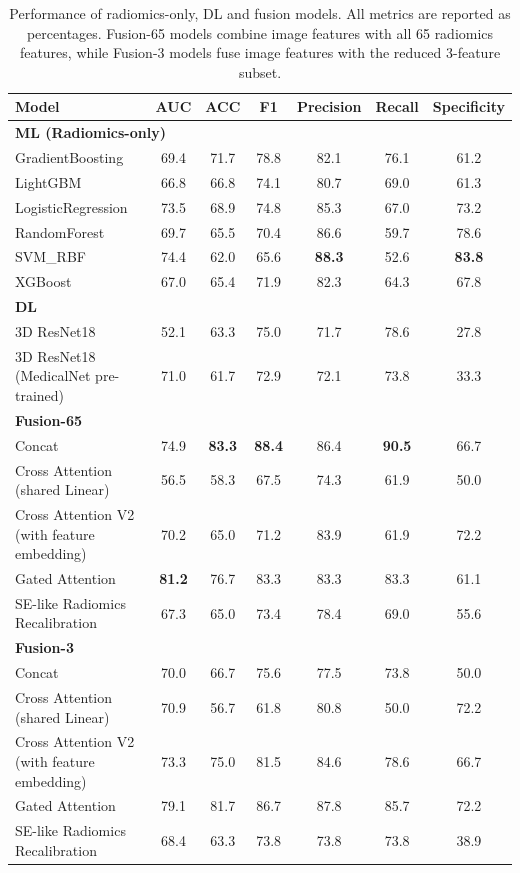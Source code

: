 \documentclass[final,british,a4paper,12pt]{phdthesis}
\begin{document}
\begin{table}[ht]
\centering
\caption{Performance of radiomics-only, DL and fusion models. All metrics are reported as percentages. Fusion-65 models combine image features with all 65 radiomics features, while Fusion-3 models fuse image features with the reduced 3-feature subset.}\label{table:perform}
\begin{tabular}{p{7cm}cccccc}
\toprule
Model & AUC & ACC & F1 & Precision & Recall  & Specificity\\
\midrule
\multicolumn{7}{l}{\textbf{ML (Radiomics-only)}} \\
GradientBoosting         & 69.4 & 71.7 & 78.8 & 82.1 & 76.1 & 61.2 \\
LightGBM                 & 66.8 & 66.8 & 74.1 & 80.7 & 69.0 & 61.3 \\
LogisticRegression       & 73.5 & 68.9 & 74.8 & 85.3 & 67.0 & 73.2 \\
RandomForest             & 69.7 & 65.5 & 70.4 & 86.6 & 59.7 & 78.6 \\
SVM\_RBF                 & 74.4 & 62.0 & 65.6 & \textbf{88.3} & 52.6 & \textbf{83.8} \\
XGBoost                  & 67.0 & 65.4 & 71.9 & 82.3 & 64.3 & 67.8 \\
\midrule
\multicolumn{7}{l}{\textbf{DL}} \\
3D ResNet18                          & 52.1 & 63.3 & 75.0 & 71.7 & 78.6 & 27.8 \\
3D ResNet18 (MedicalNet pre-trained) & 71.0 & 61.7 & 72.9 & 72.1 & 73.8 & 33.3 \\
\midrule
\multicolumn{7}{l}{\textbf{Fusion-65}} \\
Concat                              & 74.9 & \textbf{83.3} & \textbf{88.4} & 86.4 & \textbf{90.5} & 66.7 \\
Cross Attention (shared Linear)     & 56.5 & 58.3 & 67.5 & 74.3 & 61.9 & 50.0 \\
Cross Attention V2 (with feature embedding) & 70.2 & 65.0 & 71.2 & 83.9 & 61.9 & 72.2 \\
Gated Attention                     & \textbf{81.2} & 76.7 & 83.3 & 83.3 & 83.3 & 61.1 \\
SE-like Radiomics Recalibration     & 67.3 & 65.0 & 73.4 & 78.4 & 69.0 & 55.6 \\
\midrule
\multicolumn{7}{l}{\textbf{Fusion-3}} \\
Concat                              & 70.0 & 66.7 & 75.6 & 77.5 & 73.8 & 50.0 \\
Cross Attention (shared Linear)     & 70.9 & 56.7 & 61.8 & 80.8 & 50.0 & 72.2 \\
Cross Attention V2 (with feature embedding) & 73.3 & 75.0 & 81.5 & 84.6 & 78.6 & 66.7 \\
Gated Attention                     & 79.1 & 81.7 & 86.7 & 87.8 & 85.7 & 72.2 \\
SE-like Radiomics Recalibration     & 68.4 & 63.3 & 73.8 & 73.8 & 73.8 & 38.9 \\
\midrule
\bottomrule
\end{tabular}
\end{table}
\end{document}
